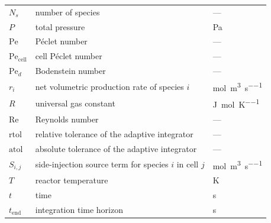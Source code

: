 \begin{longtable}{@{} p{} p{} p{} @{}}
\(N_s\)                 & number of species                                                 & ---                                                 \\
\(P\)                   & total pressure                                                    & \si{\pascal}                                        \\
\(\mathrm{Pe}\)         & P\'eclet number                                                   & ---                                                 \\
\(\mathrm{Pe}_{\mathrm{cell}}\) & cell P\'eclet number                                      & ---                                                 \\
\(\mathrm{Pe}_d\)       & Bodenstein number                                                 & ---                                                 \\
\(r_i\)                 & net volumetric production rate of species \(i\)                   & \si{\mole\per\cubic\metre\per\second}               \\
\(R\)                   & universal gas constant                                            & \si{\joule\per\mole\per\kelvin}                     \\
\(\mathrm{Re}\)         & Reynolds number                                                   & ---                                                 \\
\(\mathrm{rtol}\)       & relative tolerance of the adaptive integrator                     & ---                                                 \\
\(\mathrm{atol}\)       & absolute tolerance of the adaptive integrator                     & ---                                                 \\
\(S_{i,j}\)             & side-injection source term for species \(i\) in cell \(j\)        & \si{\mole\per\cubic\metre\per\second}               \\
\(T\)                   & reactor temperature                                               & \si{\kelvin}                                        \\
\(t\)                   & time                                                              & \si{\second}                                        \\
\(t_{\mathrm{end}}\)    & integration time horizon                                          & \si{\second}                                        \\

\end{longtable}
